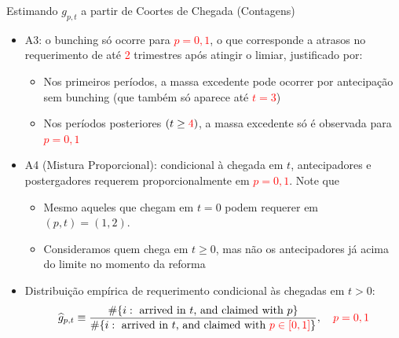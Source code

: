 \begin{frame}[label=gp_est]{Estimando $g_{p,t}$ a partir de Coortes de Chegada (Contagens)}
\begin{itemize}
    \item A3: o bunching só ocorre para \textcolor{red}{$p=0,1$}, o que corresponde a atrasos no requerimento de até \textcolor{red}{2} trimestres após atingir o limiar, justificado por:
        \begin{itemize}
            \item Nos primeiros períodos, a massa excedente pode ocorrer por antecipação sem bunching (que também só aparece até \textcolor{red}{$t=3$})
            \item Nos períodos posteriores $(t\geq \textcolor{red}{4})$, a massa excedente só é observada para \textcolor{red}{$p=0,1$}
        \end{itemize}
    \item A4 (Mistura Proporcional): condicional à chegada em $t$, antecipadores e postergadores requerem proporcionalmente em \textcolor{red}{$p=0,1$}. Note que
    \begin{itemize}
        \item Mesmo aqueles que chegam em $t=0$ podem requerer em $(p,t)=(1,2)$.
        \item Consideramos quem chega em $t\geq 0$, mas não os antecipadores já acima do limite no momento da reforma
    \end{itemize}
    \item Distribuição empírica de requerimento condicional às chegadas em $t>0$:
    \[
        \widehat{ g}_{p,t}\equiv
        \frac{\#\{i:\text{ arrived in } t\text{, and claimed with }p\}}
             {\#\{i:\text{ arrived in } t\text{, and claimed with }\textcolor{red}{p\in [0,1]}\}},
        \quad \textcolor{red}{p=0,1}
    \]
\end{itemize}
\end{frame}

